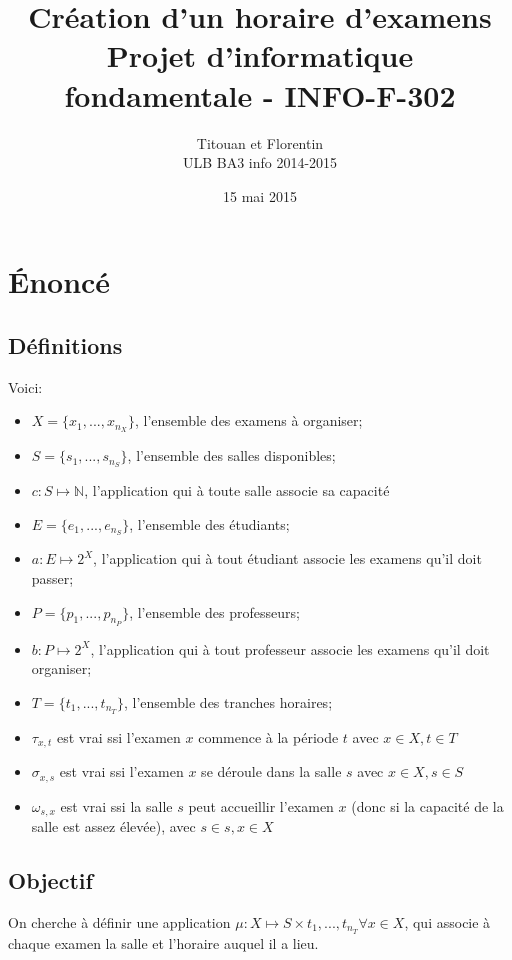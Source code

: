 \documentclass[a4paper]{article}
\title{
    Création d'un horaire d'examens\\
    \small Projet d'informatique fondamentale - INFO-F-302
}
\author{
    Titouan \bsc{Christophe} et Florentin \bsc{Hennecker}\\
    ULB BA3 info 2014-2015
}
\date{15 mai 2015}
\begin{document}
\maketitle
\tableofcontents

\section{\'Enonc\'e}
\subsection{Définitions}

Voici:
\begin{itemize}
  \item $X = \{x_1, ..., x_{n_X}\}$, l'ensemble des examens à organiser;
  \item $S = \{s_1, ..., s_{n_S}\}$, l'ensemble des salles disponibles;
  \item $c : S \mapsto \mathbb{N}$, l'application qui à toute salle associe sa capacité
  \item $E = \{e_1, ..., e_{n_S}\}$, l'ensemble des étudiants;
  \item $a : E \mapsto 2^X$, l'application qui à tout étudiant associe les examens qu'il doit passer;
  \item $P = \{p_1, ..., p_{n_P}\}$, l'ensemble des professeurs;
  \item $b : P \mapsto 2^X$, l'application qui à tout professeur associe les examens qu'il doit organiser;
  \item $T = \{t_1, ..., t_{n_T}\}$, l'ensemble des tranches horaires;
  \item $\tau_{x,t}$ est vrai ssi l'examen $x$ commence à la période $t$ avec $x \in X, t \in T$
  \item $\sigma_{x,s}$ est vrai ssi l'examen $x$ se déroule dans la salle $s$ avec $x \in X, s \in S$
  \item $\omega_{s,x}$ est vrai ssi la salle $s$ peut accueillir l'examen $x$ (donc si la capacité de la salle est assez élevée), avec $s \in s, x \in X$
\end{itemize}

\subsection{Objectif}
On cherche à définir une application $\mu : X \mapsto S \times {t_1, ..., t_{n_T}} \forall x \in X$,
qui associe à chaque examen la salle et l'horaire auquel il a lieu.
\end{document}

